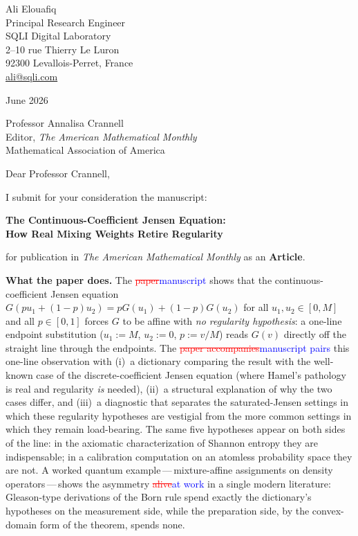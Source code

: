 \documentclass[12pt]{article}
\newcommand{\ReviewAdd}[1]{\textcolor{blue}{#1}}
\newcommand{\ReviewDel}[1]{\textcolor{red}{\sout{#1}}}
\begin{document}
\noindent
Ali Elouafiq\\
Principal Research Engineer\\
SQLI Digital Laboratory\\
2--10 rue Thierry Le Luron\\
92300 Levallois-Perret, France\\
\href{mailto:ali@sqli.com}{ali@sqli.com}

\bigskip
{} June 2026

\bigskip
\noindent
Professor Annalisa Crannell\\
Editor, \textit{The American Mathematical Monthly}\\
Mathematical Association of America

\bigskip
\noindent
Dear Professor Crannell,

\medskip
\noindent
I submit for your consideration the manuscript:

\begin{center}
  \textbf{The Continuous-Coefficient Jensen Equation:}\\
  \textbf{How Real Mixing Weights Retire Regularity}
\end{center}

\noindent
for publication in \textit{The American Mathematical Monthly} as an
\textbf{Article}.

\bigskip
\noindent\textbf{What the paper does.}
The \ReviewDel{paper}\ReviewAdd{manuscript} shows that the continuous-coefficient Jensen equation
$G(pu_1+(1-p)u_2)=pG(u_1)+(1-p)G(u_2)$ for all $u_1,u_2\in[0,M]$ and
all $p\in[0,1]$ forces $G$ to be affine with \emph{no regularity
hypothesis}: a one-line endpoint substitution ($u_1{:=}M$, $u_2{:=}0$,
$p{:=}v/M$) reads $G(v)$ directly off the straight line through the
endpoints. The \ReviewDel{paper accompanies}\ReviewAdd{manuscript pairs} this one-line observation with
(i)~a dictionary comparing the result with the well-known case of the
discrete-coefficient Jensen equation (where Hamel's pathology is real
and regularity \emph{is} needed), (ii)~a structural explanation of
why the two cases differ, and (iii)~a diagnostic that separates the
saturated-Jensen settings in which these regularity hypotheses are
vestigial from the more common settings in which they remain
load-bearing. The same five hypotheses appear on both sides of the
line: in the axiomatic characterization of Shannon entropy they are
indispensable; in a calibration computation on an atomless
probability space they are not. A worked quantum
example\,---\,mixture-affine assignments on density
operators\,---\,shows the asymmetry \ReviewDel{alive}\ReviewAdd{at work} in a single modern
literature: Gleason-type derivations of the Born rule spend exactly
the dictionary's hypotheses on the measurement side, while the
preparation side, by the convex-domain form of the theorem, spends
none.
\end{document}

